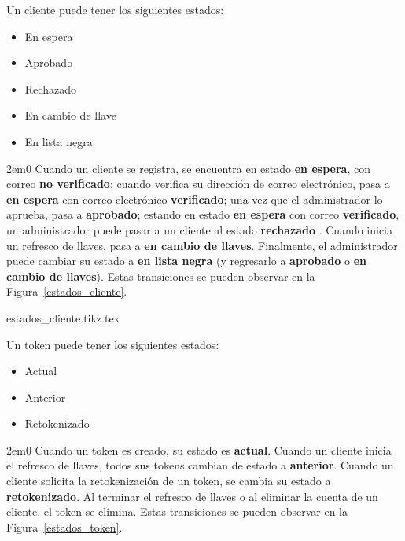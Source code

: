 {
  Un cliente puede tener los siguientes estados:
  \begin{itemize}
    \item En espera
    \item Aprobado
    \item Rechazado
    \item En cambio de llave
    \item En lista negra
  \end{itemize}

  \begin{hangparas}{2em}{0}
    Cuando un cliente se registra, se encuentra en estado \textbf{en espera},
    con correo \textbf{no verificado}; cuando verifica su dirección de correo
    electrónico, pasa a \textbf{en espera} con correo electrónico
    \textbf{verificado}; una vez que el administrador lo aprueba, pasa a
    \textbf{aprobado}; estando en estado \textbf{en espera} con correo
    \textbf{verificado}, un administrador puede pasar a un cliente al estado
    \textbf{rechazado} . Cuando inicia un refresco de llaves, pasa a
    \textbf{en cambio de llaves}. Finalmente, el administrador puede cambiar su
    estado a \textbf{en lista negra} (y regresarlo a \textbf{aprobado} o
    \textbf{en cambio de llaves}). Estas transiciones se pueden observar en la
    Figura~\ref{estados_cliente}.
  \end{hangparas}
}

%
%

\begin{sidewaysfigure}
  \begin{center}
    {estados_cliente.tikz.tex}
    \caption{Diagrama de estados de un cliente.}
    \label{estados_cliente}
  \end{center}
\end{sidewaysfigure}

{
  Un token puede tener los siguientes estados:
  \begin{itemize}
    \item Actual
    \item Anterior
    \item Retokenizado
  \end{itemize}

  \begin{hangparas}{2em}{0}
    Cuando un token es creado, su estado es \textbf{actual}. Cuando un cliente
    inicia el refresco de llaves, todos sus tokens cambian de estado a
    \textbf{anterior}. Cuando un cliente solicita la retokenización de un token,
    se cambia su estado a \textbf{retokenizado}. Al terminar el refresco de
    llaves o al eliminar la cuenta de un cliente, el token se elimina. Estas
    transiciones se pueden observar en la Figura~\ref{estados_token}.
  \end{hangparas}
}

